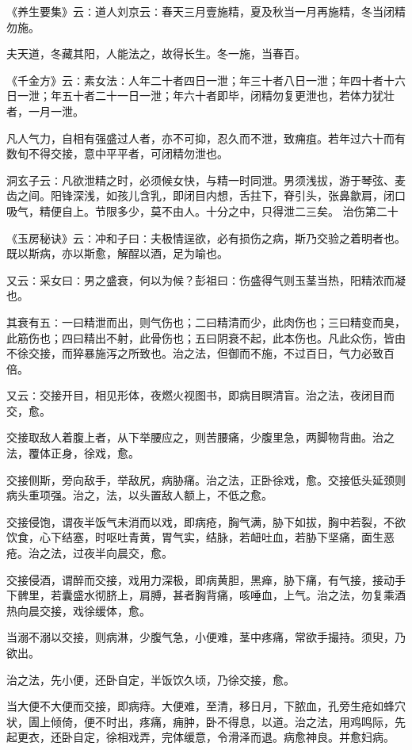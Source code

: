 \documentclass[a4paper,12pt,UTF8,twoside]{ctexbook}
\begin{document}
《养生要集》云∶道人刘京云∶春天三月壹施精，夏及秋当一月再施精，冬当闭精勿施。

夫天道，冬藏其阳，人能法之，故得长生。冬一施，当春百。

《千金方》云∶素女法∶人年二十者四日一泄；年三十者八日一泄；年四十者十六日一泄；年五十者二十一日一泄；年六十者即毕，闭精勿复更泄也，若体力犹壮者，一月一泄。

凡人气力，自相有强盛过人者，亦不可抑，忍久而不泄，致痈疽。若年过六十而有数旬不得交接，意中平平者，可闭精勿泄也。

洞玄子云∶凡欲泄精之时，必须候女快，与精一时同泄。男须浅拔，游于琴弦、麦齿之间。阳锋深浅，如孩儿含乳，即闭目内想，舌拄下，脊引头，张鼻歙肩，闭口吸气，精便自上。节限多少，莫不由人。十分之中，只得泄二三矣。
治伤第二十

《玉房秘诀》云∶冲和子曰∶夫极情逞欲，必有损伤之病，斯乃交验之着明者也。既以斯病，亦以斯愈，解酲以酒，足为喻也。

又云∶采女曰∶男之盛衰，何以为候？彭祖曰∶伤盛得气则玉茎当热，阳精浓而凝也。

其衰有五∶一曰精泄而出，则气伤也；二曰精清而少，此肉伤也；三曰精变而臭，此筋伤也；四曰精出不射，此骨伤也；五曰阴衰不起，此本伤也。凡此众伤，皆由不徐交接，而猝暴施泻之所致也。治之法，但御而不施，不过百日，气力必致百倍。

又云∶交接开目，相见形体，夜燃火视图书，即病目瞑清盲。治之法，夜闭目而交，愈。

交接取敌人着腹上者，从下举腰应之，则苦腰痛，少腹里急，两脚物背曲。治之法，覆体正身，徐戏，愈。

交接侧斯，旁向敌手，举敌尻，病胁痛。治之法，正卧徐戏，愈。交接低头延颈则病头重项强。治之，法，以头置敌人额上，不低之愈。

交接侵饱，谓夜半饭气未消而以戏，即病疮，胸气满，胁下如拔，胸中若裂，不欲饮食，心下结塞，时呕吐青黄，胃气实，结脉，若衄吐血，若胁下坚痛，面生恶疮。治之法，过夜半向晨交，愈。

交接侵酒，谓醉而交接，戏用力深极，即病黄胆，黑瘅，胁下痛，有气接，接动手下髀里，若囊盛水彻脐上，肩膊，甚者胸背痛，咳唾血，上气。治之法，勿复乘酒热向晨交接，戏徐缓体，愈。

当溺不溺以交接，则病淋，少腹气急，小便难，茎中疼痛，常欲手撮持。须臾，乃欲出。

治之法，先小便，还卧自定，半饭饮久顷，乃徐交接，愈。

当大便不大便而交接，即病痔。大便难，至清，移日月，下脓血，孔旁生疮如蜂穴状，圊上倾倚，便不时出，疼痛，痈肿，卧不得息，以道。治之法，用鸡鸣际，先起更衣，还卧自定，徐相戏弄，完体缓意，令滑泽而退。病愈神良。并愈妇病。
\end{document}
